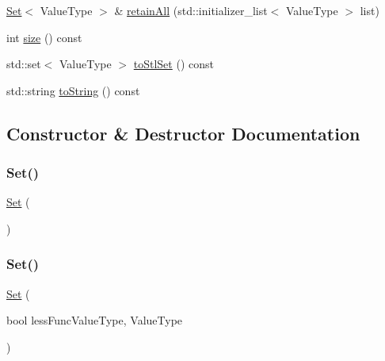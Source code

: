 \begin{DoxyCompactItemize}
\item 
\mbox{\hyperlink{classSet}{Set}}$<$ Value\+Type $>$ \& \mbox{\hyperlink{classSet_a43e5ec97918992cb365f041c3f0b67fa}{retain\+All}} (std\+::initializer\+\_\+list$<$ Value\+Type $>$ list)
\item 
int \mbox{\hyperlink{classSet_af9593d4a5ff4274efaf429cb4f9e57cc}{size}} () const
\item 
std\+::set$<$ Value\+Type $>$ \mbox{\hyperlink{classSet_a9306d32f2c4ffb40591b1cccf1cf2d25}{to\+Stl\+Set}} () const
\item 
std\+::string \mbox{\hyperlink{classSet_a1fe5121d6528fdea3f243321b3fa3a49}{to\+String}} () const
\end{DoxyCompactItemize}


\subsection{Constructor \& Destructor Documentation}
\mbox{\label{classSet_ad2293f668ddb9a9fc99f78a737f6e86e}} 
\subsubsection{\texorpdfstring{Set()}{Set()}\hspace{0.1cm}{\footnotesize\ttfamily [1/7]}}
{\footnotesize\ttfamily \mbox{\hyperlink{classSet}{Set}} (\begin{DoxyParamCaption}{ }\end{DoxyParamCaption})}

\mbox{\label{classSet_aebae7de55448c35012838560a7721060}} 
\subsubsection{\texorpdfstring{Set()}{Set()}\hspace{0.1cm}{\footnotesize\ttfamily [2/7]}}
{\footnotesize\ttfamily \mbox{\hyperlink{classSet}{Set}} (\begin{DoxyParamCaption}\item[{bool }]{less\+FuncValue\+Type, Value\+Type }\end{DoxyParamCaption})}

\mbox{\label{classSet_a22b821fcf521183327753dec78530f36}} 
